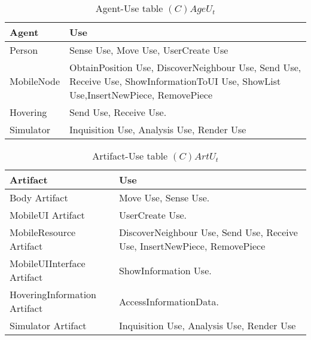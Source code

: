 \begin{table}[H]
	\centering
	\begin{tabular}{|p{4cm}|p{8cm}|}
			\hline
			\textbf{Agent} & \textbf{Use} \\
			\hline
			Person & Sense Use, Move Use, UserCreate Use\\
			\hline
      MobileNode & ObtainPosition Use, DiscoverNeighbour Use, Send Use, Receive Use,
      ShowInformationToUI Use, ShowList Use,InsertNewPiece, RemovePiece  \\
			\hline
			Hovering & Send Use, Receive Use. \\
			\hline
			Simulator & Inquisition Use, Analysis Use, Render Use \\
			\hline
		\end{tabular}
	\caption{Agent-Use table $(C)AgeU_t$}
	\label{tab:cageut}
\end{table}

\begin{table}[H]
	\centering
	\begin{tabular}{|p{4cm}|p{8cm}|}
			\hline
			\textbf{Artifact} & \textbf{Use} \\
			\hline
			Body Artifact & Move Use, Sense Use. \\
			\hline
			MobileUI Artifact & UserCreate Use. \\
			\hline
      MobileResource Artifact & DiscoverNeighbour Use, Send Use, Receive Use,
      InsertNewPiece, RemovePiece \\
			\hline
			MobileUIInterface Artifact & ShowInformation Use. \\
			\hline
			HoveringInformation Artifact & AccessInformationData. \\
			\hline
			Simulator Artifact & Inquisition Use, Analysis Use, Render Use \\
			\hline
		\end{tabular}
	\caption{Artifact-Use table $(C)ArtU_t$}
	\label{tab:cartut}
\end{table}

